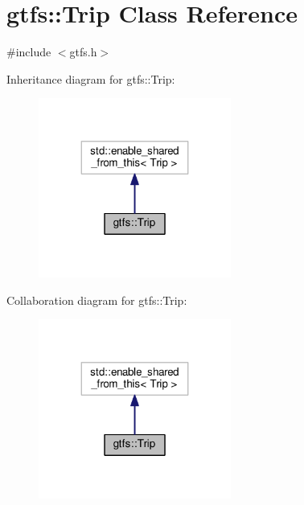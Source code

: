\hypertarget{classgtfs_1_1Trip}{}\section{gtfs\+:\+:Trip Class Reference}
\label{classgtfs_1_1Trip}


{\ttfamily \#include $<$gtfs.\+h$>$}



Inheritance diagram for gtfs\+:\+:Trip\+:\nopagebreak
\begin{figure}[H]
\begin{center}
\leavevmode
\includegraphics[width=179pt]{classgtfs_1_1Trip__inherit__graph}
\end{center}
\end{figure}


Collaboration diagram for gtfs\+:\+:Trip\+:\nopagebreak
\begin{figure}[H]
\begin{center}
\leavevmode
\includegraphics[width=179pt]{classgtfs_1_1Trip__coll__graph}
\end{center}
\end{figure}
